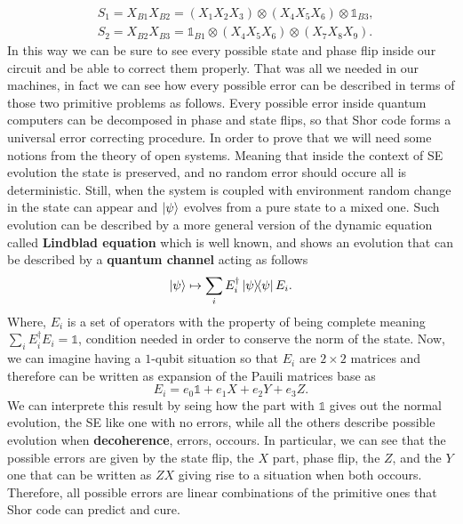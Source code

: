 \begin{align}
    &S_1 = X_{B1}X_{B2} = (X_1X_2X_3)\otimes(X_4X_5X_6)\otimes\mathbb{1}_{B3},\\
    &S_2 = X_{B2}X_{B3} = \mathbb{1}_{B1} \otimes (X_4X_5X_6)\otimes (X_7X_8X_9).
\end{align}
In this way we can be sure to see every possible state and phase flip inside our circuit and be able to correct them properly. That was all we needed in our machines, in fact we can see how every possible error can be described in terms of those two primitive problems as follows.
{
    Every possible error inside quantum computers can be decomposed in phase and state flips, so that Shor code forms a universal error correcting procedure.
}
{
    In order to prove that we will need some notions from the theory of open systems. Meaning that inside the context of SE evolution the state is preserved, and no random error should occure all is deterministic. Still, when the system is coupled with environment random change in the state can appear and $\ket{\psi}$ evolves from a pure state to a mixed one. Such evolution can be described by a more general version of the dynamic equation called \textbf{Lindblad equation} which is well known, and shows an evolution that can be described by a \textbf{quantum channel} acting as follows
    \begin{equation}
        \ket{\psi} \mapsto \sum_i E_i^\dagger \ketbra{\psi} E_i.
    \end{equation}
    Where, $E_i$ is a set of operators with the property of being complete meaning $\sum_i E_i^\dagger E_i = \mathbb{1}$, condition needed in order to conserve the norm of the state. Now, we can imagine having a $1$-qubit situation so that $E_i$ are $2\times 2$ matrices and therefore can be written as expansion of the Pauili matrices base as
    \begin{equation}
        E_i = e_0\mathbb{1} + e_1 X + e_2Y + e_3Z.
    \end{equation}
    We can interprete this result by seing how the part with $\mathbb{1}$ gives out the normal evolution, the SE like one with no errors, while all the others describe possible evolution when \textbf{decoherence}, errors, occours. In particular, we can see that the possible errors are given by the state flip, the $X$ part, phase flip, the $Z$, and the $Y$ one that can be written as $ZX$ giving rise to a situation when both occours. Therefore, all possible errors are linear combinations of the primitive ones that Shor code can predict and cure.
}